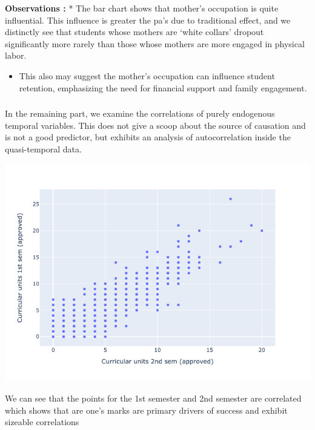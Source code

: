\documentclass[
  letterpaper,
  DIV=11,
  numbers=noendperiod]{scrartcl}
\providecommand{\tightlist}{%
  \setlength{\itemsep}{0pt}\setlength{\parskip}{0pt}}\usepackage{longtable,booktabs,array}
\begin{document}
\textbf{Observations :} * The bar chart shows that mother's occupation
is quite influential. This influence is greater the pa's due to
traditional effect, and we distinctly see that students whose mothers
are \enquote*{white collars} dropout significantly more rarely than
those whose mothers are more engaged in physical labor.

\begin{itemize}
\tightlist
\item
  This also may suggest the mother's occupation can influence student
  retention, emphasizing the need for financial support and family
  engagement.
\end{itemize}

\hypertarget{section}{%
\subsubsection{}\label{section}}

In the remaining part, we examine the correlations of purely endogenous
temporal variables. This does not give a scoop about the source of
causation and is not a good predictor, but exhibits an analysis of
autocorrelation inside the quasi-temporal data.

\includegraphics{report_AzadhdhinNedalYunisAlFraijat_files/figure-pdf/cell-49-output-1.png}

We can see that the points for the 1st semester and 2nd semester are
correlated which shows that are one's marks are primary drivers of
success and exhibit sizeable correlations
\end{document}
